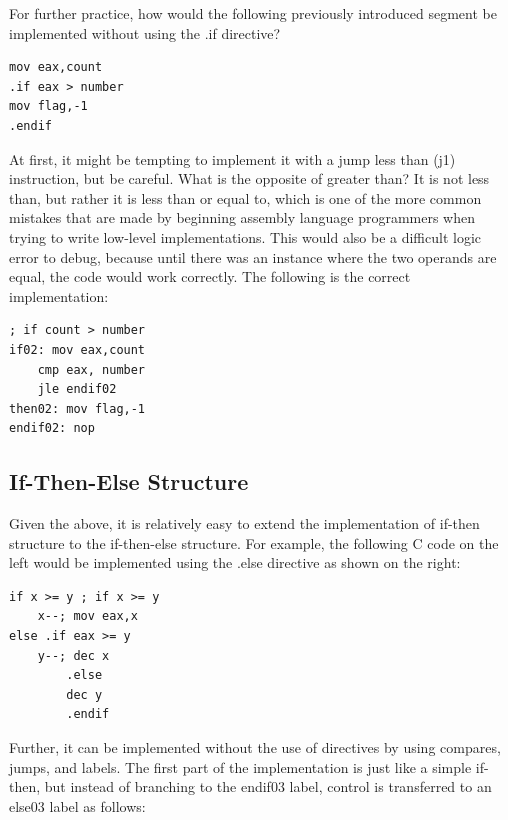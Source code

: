 \documentclass[10pt]{book}
\begin{document}
For further practice, how would the following previously introduced segment be implemented without using the .if directive?
\begin{verbatim}
mov eax,count
.if eax > number
mov flag,-1
.endif
\end{verbatim}

At first, it might be tempting to implement it with a jump less than (j1) instruction, but be careful. What is the opposite of greater than? It is not less than, but rather it is less than or equal to, which is one of the more common mistakes that are made by beginning assembly language programmers when trying to write low-level implementations. This would also be a difficult logic error to debug, because until there was an instance where the two operands are equal, the code would work correctly. The following is the correct implementation:

\begin{verbatim}
; if count > number
if02: mov eax,count
    cmp eax, number
    jle endif02
then02: mov flag,-1
endif02: nop
\end{verbatim}

\subsection{If-Then-Else Structure}
Given the above, it is relatively easy to extend the implementation of if-then structure to the if-then-else structure. For example, the following C code on the left would be implemented using the .else directive as shown on the right:

\begin{verbatim}
if x >= y ; if x >= y
    x--; mov eax,x
else .if eax >= y
    y--; dec x
        .else
        dec y
        .endif
\end{verbatim}

Further, it can be implemented without the use of directives by using compares, jumps, and labels. The first part of the implementation is just like a simple if-then, but instead of branching to the endif03 label, control is transferred to an else03 label as follows:
\end{document}
